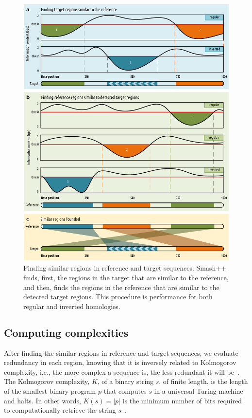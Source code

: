 \begin{figure}[!h]
  \centering
  \includegraphics[width=.95\linewidth]{simil.pdf}
  \caption{Finding similar regions in reference and target sequences. Smash++ finds, first, the regions in the target that are similar to the reference, and then, finds the regions in the reference that are similar to the detected target regions. This procedure is performance for both regular and inverted homologies.}
  \label{fig.simil}
\end{figure}

\subsection{Computing complexities}
After finding the similar regions in reference and target sequences, we evaluate redundancy in each region, knowing that it is inversely related to Kolmogorov complexity, i.e., the more complex a sequence is, the less redundant it will be~\cite{hosseini2018cryfa}. The Kolmogorov complexity, $K$, of a binary string $s$, of finite length, is the length of the smallest binary program $p$ that computes $s$ in a universal Turing machine and halts. In other words, $K(s)=|p|$ is the minimum number of bits required to computationally retrieve the string $s$~\cite{turing1936on,li2009an}.

